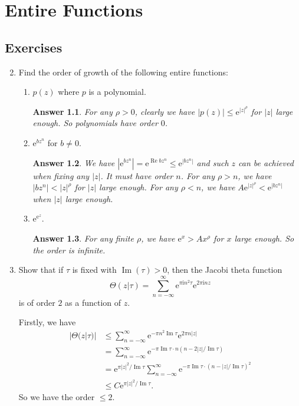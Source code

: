 \documentclass[11pt]{report}
\theoremstyle{mythm}
\let\oldendproof\endproof
\renewenvironment{proof}[1][\proofname]{%
  \oldproof[\normalfont \bfseries #1]%
}{\oldendproof}
\renewcommand*{\proofname}{Proof}
\theoremstyle{myans}
\newtheorem*{answer}{Answer}
\newcommand{\mi}{\mathrm{i}}
\newcommand{\me}{\mathrm{e}}
\renewcommand{\Re}{\operatorname{Re}}
\renewcommand{\Im}{\operatorname{Im}}
\begin{document}
\setcounter{chapter}{4}
\chapter{Entire Functions}

\section{Exercises}

\begin{enumerate}
  \setcounter{enumi}{1}
  \item Find the order of growth of the following entire functions:
  \begin{enumerate}
    \item $p(z)$ where $p$ is a polynomial. 
    \begin{answer}
      For any $\rho > 0$, clearly we have $|p(z)| \leq \me^{|z|^\rho}$ for $|z|$ large enough.
      So polynomials have order $0$.
    \end{answer}
    \item $\me^{bz^n}$ for $b\neq 0$.
    \begin{answer}
      We have $|\me^{bz^n}| = \me^{\Re bz^n} \leq \me^{|bz^n|}$ and such $z$ can be achieved when fixing any $|z|$.
      It must have order $n$. For any $\rho > n$, we have $|bz^n| < |z|^\rho$ for $|z|$ large enough.
      For any $\rho < n$, we have $A\me^{|z|^\rho} < \me^{|bz^n|}$ when $|z|$ large enough.
    \end{answer}
    \item $\me^{\me^z}$.
    \begin{answer}
      For any finite $\rho$, we have $\me^x > A x^\rho$ for $x$ large enough. So the order is infinite.
    \end{answer}
  \end{enumerate}
  \item Show that if $\tau$ is fixed with $\Im(\tau ) > 0$, then the Jacobi theta function
  \[ \Theta(z|\tau) = \sum_{n=-\infty}^{\infty} \me^{\pi \mi n^2 \tau} \me^{2\pi \mi n z} \]
  is of order $2$ as a function of $z$. 
  \begin{proof}
    Firstly, we have
    \begin{align*}
      |\Theta(z|\tau)| &\leq \sum_{n=-\infty}^{\infty} \me^{-\pi n^2 \Im \tau}\me^{2\pi n |z|} \\
      &= \sum_{n=-\infty}^{\infty} \me^{-\pi \Im\tau \cdot n(n - 2|z|/\Im \tau)}\\
      &= \me^{\pi |z|^2 / \Im \tau} \sum_{n=-\infty}^{\infty} \me^{-\pi \Im\tau \cdot (n - |z|/\Im \tau)^2}\\
      &\leq C\me^{\pi |z|^2 / \Im \tau}.
    \end{align*}
    So we have the order $\leq 2$.


\end{proof}
\end{enumerate}
\end{document}
